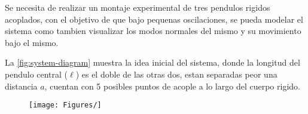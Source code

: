
Se necesita de realizar un montaje experimental de tres pendulos rigidos
acoplados, con el objetivo de que bajo pequenas oscilaciones, se pueda modelar
el sistema como tambien visualizar los modos normales del mismo y su movimiento
bajo el mismo.

La \cref{fig:system-diagram} muestra la idea inicial del sistema, donde
la longitud del pendulo central (\( \ell \)) es el doble de las otras dos,
estan separadas peor una distancia \( a \), cuentan con 5 posibles puntos de
acople a lo largo del cuerpo rigido.

\begin{figure}
	\centering
	\texttt{[image: Figures/]}
\caption{}
\label{fig:}
\end{figure}
